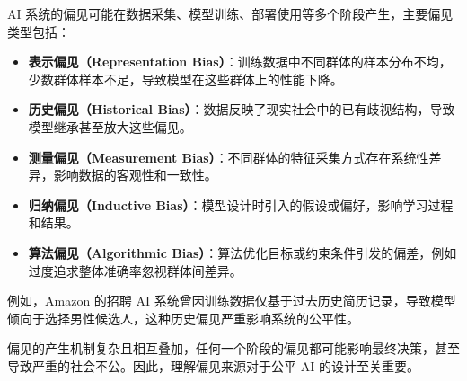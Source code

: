 
AI 系统的偏见可能在数据采集、模型训练、部署使用等多个阶段产生，主要偏见类型包括：

\begin{itemize}
	\item \textbf{表示偏见（Representation Bias）}：训练数据中不同群体的样本分布不均，少数群体样本不足，导致模型在这些群体上的性能下降。
	\item \textbf{历史偏见（Historical Bias）}：数据反映了现实社会中的已有歧视结构，导致模型继承甚至放大这些偏见。
	\item \textbf{测量偏见（Measurement Bias）}：不同群体的特征采集方式存在系统性差异，影响数据的客观性和一致性。
	\item \textbf{归纳偏见（Inductive Bias）}：模型设计时引入的假设或偏好，影响学习过程和结果。
	\item \textbf{算法偏见（Algorithmic Bias）}：算法优化目标或约束条件引发的偏差，例如过度追求整体准确率忽视群体间差异。
\end{itemize}

例如，Amazon 的招聘 AI 系统曾因训练数据仅基于过去历史简历记录，导致模型倾向于选择男性候选人，这种历史偏见严重影响系统的公平性\cite{Mehrabi2021Survey}。

偏见的产生机制复杂且相互叠加，任何一个阶段的偏见都可能影响最终决策，甚至导致严重的社会不公。因此，理解偏见来源对于公平 AI 的设计至关重要。